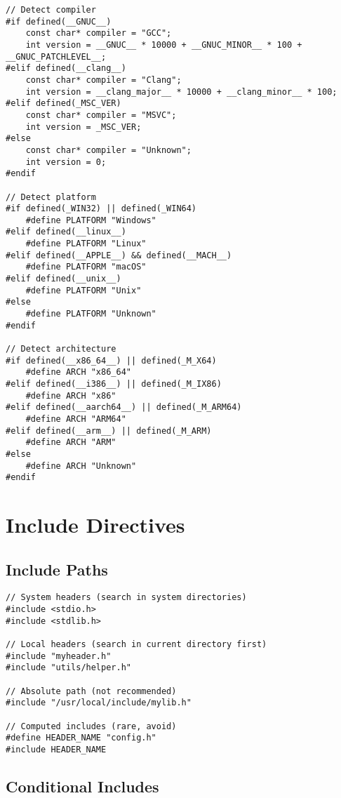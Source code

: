 \begin{lstlisting}
// Detect compiler
#if defined(__GNUC__)
    const char* compiler = "GCC";
    int version = __GNUC__ * 10000 + __GNUC_MINOR__ * 100 + __GNUC_PATCHLEVEL__;
#elif defined(__clang__)
    const char* compiler = "Clang";
    int version = __clang_major__ * 10000 + __clang_minor__ * 100;
#elif defined(_MSC_VER)
    const char* compiler = "MSVC";
    int version = _MSC_VER;
#else
    const char* compiler = "Unknown";
    int version = 0;
#endif

// Detect platform
#if defined(_WIN32) || defined(_WIN64)
    #define PLATFORM "Windows"
#elif defined(__linux__)
    #define PLATFORM "Linux"
#elif defined(__APPLE__) && defined(__MACH__)
    #define PLATFORM "macOS"
#elif defined(__unix__)
    #define PLATFORM "Unix"
#else
    #define PLATFORM "Unknown"
#endif

// Detect architecture
#if defined(__x86_64__) || defined(_M_X64)
    #define ARCH "x86_64"
#elif defined(__i386__) || defined(_M_IX86)
    #define ARCH "x86"
#elif defined(__aarch64__) || defined(_M_ARM64)
    #define ARCH "ARM64"
#elif defined(__arm__) || defined(_M_ARM)
    #define ARCH "ARM"
#else
    #define ARCH "Unknown"
#endif
\end{lstlisting}

\section{Include Directives}

\subsection{Include Paths}

\begin{lstlisting}
// System headers (search in system directories)
#include <stdio.h>
#include <stdlib.h>

// Local headers (search in current directory first)
#include "myheader.h"
#include "utils/helper.h"

// Absolute path (not recommended)
#include "/usr/local/include/mylib.h"

// Computed includes (rare, avoid)
#define HEADER_NAME "config.h"
#include HEADER_NAME
\end{lstlisting}

\subsection{Conditional Includes}

